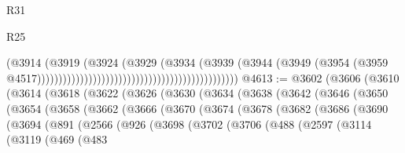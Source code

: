 \begin{lexlean}{R31}
\begin{lexlean}{R25}
\begin{coremodule}
{{{{{{{{{{{{{{{{{{{{{{{{{{{{{{{{{{{{{{{{{{{{{{{{{{{{{{{{{{{{{{{{{{{{{{{{{{{{{{{{{{{{{{{{{{{{{{{{{{{{{{{{{{{{{{{{{{{{{{{{{{{{{{{{{{{{{{{{{{{{{{{{{{{{{{{{{{{{{{{{{{{{{{{{{{{{{{{{{{{{{{{{{{{{{{{{{{{{{{{                                                                              (@3914
                                                                                (@3919
                                                                                  (@3924
                                                                                    (@3929
                                                                                      (@3934
                                                                                        (@3939
                                                                                          (@3944
                                                                                            (@3949
                                                                                              (@3954
                                                                                                (@3959
                                                                                                  @4517)))))))))))))))))))))))))))))))))))))))))))))))
@4613 := @3602
    (@3606
      (@3610
        (@3614
          (@3618
            (@3622
              (@3626
                (@3630
                  (@3634
                    (@3638
                      (@3642
                        (@3646
                          (@3650
                            (@3654
                              (@3658
                                (@3662
                                  (@3666
                                    (@3670
                                      (@3674
                                        (@3678
                                          (@3682
                                            (@3686
                                              (@3690
                                                (@3694
                                                  (@891
                                                    (@2566
                                                      (@926
                                                        (@3698
                                                          (@3702
                                                            (@3706
                                                              (@488
                                                                (@2597
                                                                  (@3114
                                                                    (@3119
                                                                      (@469
                                                                        (@483
}}}}}}}}}}}}}}}}}}}}}}}}}}}}}}}}}}}}}}}}}}}}}}}}}}}}}}}}}}}}}}}}}}}}}}}}}}}}}}}}}}}}}}}}}}}}}}}}}}}}}}}}}}}}}}}}}}}}}}}}}}}}}}}}}}}}}}}}}}}}}}}}}}}}}}}}}}}}}}}}}}}}}}}}}}}}}}}}}}}}}}}}}}}}}}}}}}}}}}}
\end{coremodule}
\end{lexlean}
\end{lexlean}
